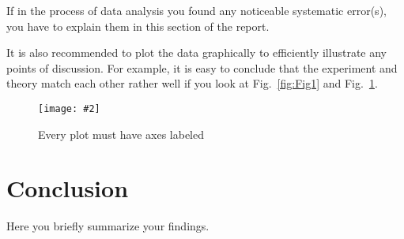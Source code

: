 \documentclass[letterpaper,12pt]{article}
\newcommand{\labfig}[4]{
  \begin{figure}[H]
    \centering
    \texttt{[image: \#2]}
    \caption{#3}
    \label{#4}
  \end{figure}}
\begin{document}
If in the process of data analysis you found any noticeable systematic
error(s), you have to explain them in this section of the report.

It is also recommended to plot the data graphically to efficiently illustrate
any points of discussion. For example, it is easy to conclude that the
experiment and theory match each other rather well if you look at
Fig.~\ref{fig:Fig1} and Fig.~\ref{fig:Fig2}.

\labfig{8}{second_plot.png}{Every plot must have axes labeled}{fig:Fig2}

\section{Conclusion}
Here you briefly summarize your findings.









\end{document}
